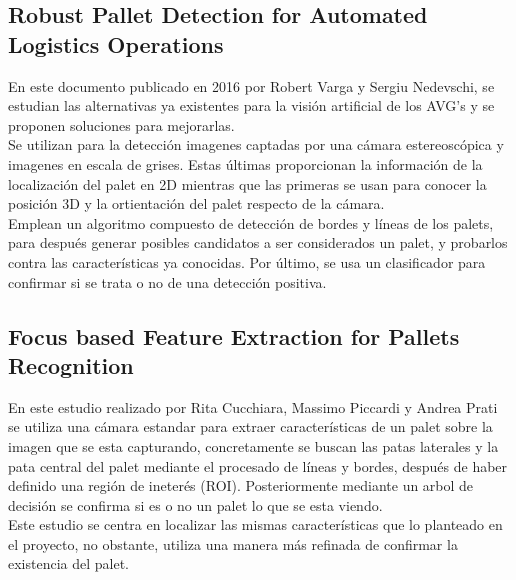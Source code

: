 \subsection{Robust Pallet Detection for Automated Logistics Operations}
En este documento publicado en 2016 por Robert Varga y Sergiu Nedevschi, se estudian las alternativas ya existentes para la visión artificial de los AVG's y se proponen soluciones para mejorarlas.\\
Se utilizan para la detección imagenes captadas por una cámara estereoscópica y imagenes en escala de grises. Estas últimas proporcionan la información de la localización del palet en 2D mientras que las primeras se usan para conocer la posición 3D y la ortientación del palet respecto de la cámara.\\
Emplean un algoritmo compuesto de detección de bordes y líneas de los palets, para después generar posibles candidatos a ser considerados un palet, y probarlos contra las características ya conocidas. Por último, se usa un clasificador para confirmar si se trata o no de una detección positiva.

\subsection{Focus based Feature Extraction for Pallets Recognition}
En este estudio realizado por Rita Cucchiara, Massimo Piccardi y Andrea Prati se utiliza una cámara estandar para extraer características de un palet sobre la imagen que se esta capturando, concretamente se buscan las patas laterales y la pata central del palet mediante el procesado de líneas y bordes, después de haber definido una región de ineterés (ROI). Posteriormente mediante un arbol de decisión se confirma si es o no un palet lo que se esta viendo.\\ Este estudio se centra en localizar las mismas características que lo planteado en el proyecto, no obstante, utiliza una manera más refinada de confirmar la existencia del palet.

